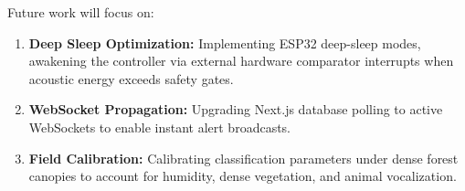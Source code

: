 \documentclass[11pt,a4paper]{article}
\begin{document}
Future work will focus on:
\begin{enumerate}
    \item \textbf{Deep Sleep Optimization:} Implementing ESP32 deep-sleep modes, awakening the controller via external hardware comparator interrupts when acoustic energy exceeds safety gates.
    \item \textbf{WebSocket Propagation:} Upgrading Next.js database polling to active WebSockets to enable instant alert broadcasts.
    \item \textbf{Field Calibration:} Calibrating classification parameters under dense forest canopies to account for humidity, dense vegetation, and animal vocalization.
\end{enumerate}
\end{document}
